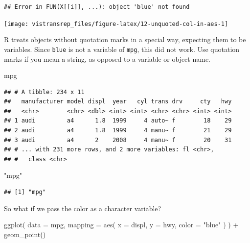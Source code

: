 \documentclass[]{book}
\newenvironment{Shaded}{}{}
\newcommand{\DataTypeTok}[1]{#1}
\newcommand{\KeywordTok}[1]{\textcolor[rgb]{0.00,0.00,1.00}{#1}}
\newcommand{\NormalTok}[1]{#1}
\newcommand{\OperatorTok}[1]{#1}
\newcommand{\StringTok}[1]{\textcolor[rgb]{0.00,0.50,0.50}{#1}}
\begin{document}
\begin{verbatim}
## Error in FUN(X[[i]], ...): object 'blue' not found
\end{verbatim}

\begin{flushright}\texttt{[image: vistransrep\_files/figure-latex/12-unquoted-col-in-aes-1]} \end{flushright}

R treats objects without quotation marks in a special way, expecting them to be variables.
Since \texttt{blue} is not a variable of \texttt{mpg}, this did not work.
Use quotation marks if you mean a string, as opposed to a variable or object name.

\begin{Shaded}
\begin{Highlighting}[]
\NormalTok{mpg}
\end{Highlighting}
\end{Shaded}

\begin{verbatim}
## # A tibble: 234 x 11
##   manufacturer model displ  year   cyl trans drv     cty   hwy
##   <chr>        <chr> <dbl> <int> <int> <chr> <chr> <int> <int>
## 1 audi         a4      1.8  1999     4 auto~ f        18    29
## 2 audi         a4      1.8  1999     4 manu~ f        21    29
## 3 audi         a4      2    2008     4 manu~ f        20    31
## # ... with 231 more rows, and 2 more variables: fl <chr>,
## #   class <chr>
\end{verbatim}

\begin{Shaded}
\begin{Highlighting}[]
\StringTok{"mpg"}
\end{Highlighting}
\end{Shaded}

\begin{verbatim}
## [1] "mpg"
\end{verbatim}

So what if we pass the color as a character variable?

\begin{Shaded}
\begin{Highlighting}[]
\KeywordTok{ggplot}\NormalTok{(}
  \DataTypeTok{data =}\NormalTok{ mpg,}
  \DataTypeTok{mapping =} \KeywordTok{aes}\NormalTok{(}
    \DataTypeTok{x =}\NormalTok{ displ,}
    \DataTypeTok{y =}\NormalTok{ hwy,}
    \DataTypeTok{color =} \StringTok{"blue"}
\NormalTok{  )}
\NormalTok{) }\OperatorTok{+}
\StringTok{  }\KeywordTok{geom_point}\NormalTok{()}
\end{Highlighting}
\end{Shaded}
\end{document}
